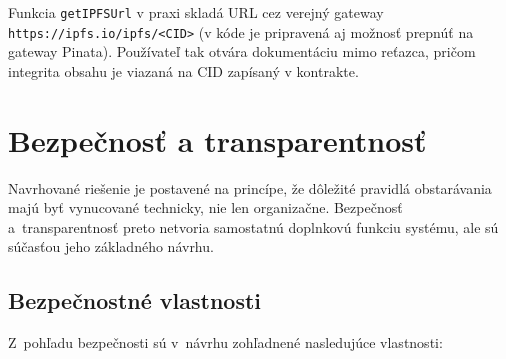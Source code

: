 Funkcia \texttt{getIPFSUrl} v praxi skladá URL cez verejný gateway
\texttt{https://ipfs.io/ipfs/<CID>} (v kóde je pripravená aj možnosť prepnúť na
gateway Pinata). Používateľ tak otvára dokumentáciu mimo reťazca, pričom integrita
obsahu je viazaná na CID zapísaný v kontrakte.


\section{Bezpečnosť a transparentnosť}
\label{sec:security}

Navrhované riešenie je postavené na princípe, že dôležité pravidlá
obstarávania majú byť vynucované technicky, nie len organizačne.
Bezpečnosť a~transparentnosť preto netvoria samostatnú doplnkovú
funkciu systému, ale sú súčasťou jeho základného návrhu.

\subsection{Bezpečnostné vlastnosti}
\label{subsec:security_properties}

Z~pohľadu bezpečnosti sú v~návrhu zohľadnené nasledujúce vlastnosti:

